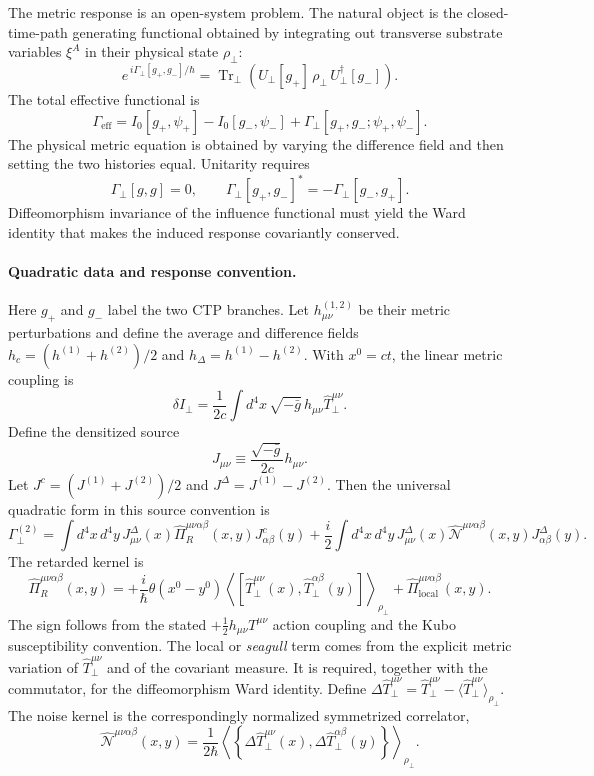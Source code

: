 \documentclass[11pt]{article}
\begin{document}
The metric response is an open-system problem. The natural object is the closed-time-path generating functional obtained by integrating out transverse substrate variables $\xi^A$ in their physical state $\rho_\perp$:
\[
e^{\,i\Gamma_\perp[g_+,g_-]/\hbar}
=
\operatorname{Tr}_{\perp}
\left(
U_{\perp}[g_+]\,\rho_\perp\,
U_{\perp}^{\dagger}[g_-]
\right).
\]
The total effective functional is
\[
\Gamma_{\mathrm{eff}}
=I_0[g_+,\psi_+]-I_0[g_-,\psi_-]
+\Gamma_\perp[g_+,g_-;\psi_+,\psi_-].
\]
The physical metric equation is obtained by varying the difference field and then setting the two histories equal. Unitarity requires
\[
\Gamma_\perp[g,g]=0,
\qquad
\Gamma_\perp[g_+,g_-]^*
=-\Gamma_\perp[g_-,g_+].
\]
Diffeomorphism invariance of the influence functional must yield the Ward identity that makes the induced response covariantly conserved.

\paragraph{Quadratic data and response convention.}
Here $g_+$ and $g_-$ label the two CTP branches. Let $h_{\mu\nu}^{(1,2)}$ be their metric perturbations and define the average and difference fields $h_c=(h^{(1)}+h^{(2)})/2$ and $h_\Delta=h^{(1)}-h^{(2)}$. With $x^0=ct$, the linear metric coupling is
\[
\delta I_\perp
=\frac{1}{2c}\int d^4x\,\sqrt{-\bar g}\,
h_{\mu\nu}\widehat T_\perp^{\mu\nu}.
\]
Define the densitized source
\[
J_{\mu\nu}\equiv\frac{\sqrt{-\bar g}}{2c}h_{\mu\nu}.
\]
Let $J^c=(J^{(1)}+J^{(2)})/2$ and $J^\Delta=J^{(1)}-J^{(2)}$. Then the universal quadratic form in this source convention is
\[
\Gamma_\perp^{(2)}
=
\int d^4x\,d^4y\,
J^\Delta_{\mu\nu}(x)
\widehat\Pi_R^{\mu\nu\alpha\beta}(x,y)
J^c_{\alpha\beta}(y)
+\frac{i}{2}\int d^4x\,d^4y\,
J^\Delta_{\mu\nu}(x)
\widehat{\mathcal N}^{\mu\nu\alpha\beta}(x,y)
J^\Delta_{\alpha\beta}(y).
\]
The retarded kernel is
\[
\boxed{
\widehat\Pi_R^{\mu\nu\alpha\beta}(x,y)
=+\frac{i}{\hbar}\theta(x^0-y^0)
\left\langle
\left[
\widehat T_\perp^{\mu\nu}(x),
\widehat T_\perp^{\alpha\beta}(y)
\right]
\right\rangle_{\rho_\perp}
+\widehat\Pi_{\mathrm{local}}^{\mu\nu\alpha\beta}(x,y).
}
\]
The sign follows from the stated $+\tfrac12h_{\mu\nu}T^{\mu\nu}$ action coupling and the Kubo susceptibility convention. The local or \emph{seagull} term comes from the explicit metric variation of $\widehat T_\perp^{\mu\nu}$ and of the covariant measure. It is required, together with the commutator, for the diffeomorphism Ward identity. Define $\Delta\widehat T_\perp^{\mu\nu}=\widehat T_\perp^{\mu\nu}-\langle\widehat T_\perp^{\mu\nu}\rangle_{\rho_\perp}$. The noise kernel is the correspondingly normalized symmetrized correlator,
\[
\widehat{\mathcal N}^{\mu\nu\alpha\beta}(x,y)
=\frac{1}{2\hbar}
\left\langle
\left\{
\Delta\widehat T_\perp^{\mu\nu}(x),
\Delta\widehat T_\perp^{\alpha\beta}(y)
\right\}
\right\rangle_{\rho_\perp}.
\]
\end{document}
